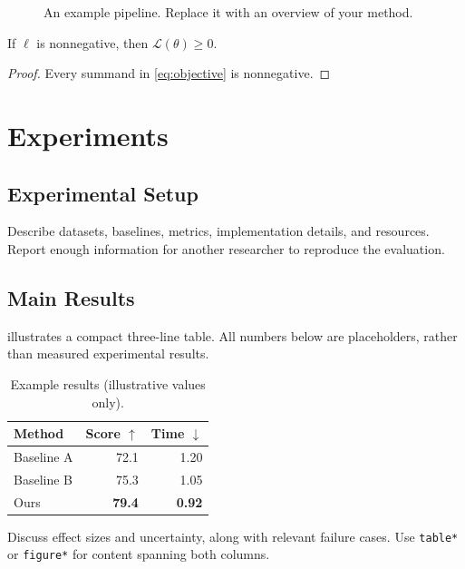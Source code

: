 \documentclass[twocolumn]{paper}
\begin{document}
\begin{figure}[t]
  \centering
  \caption{An example pipeline. Replace it with an overview of your method.}
  \label{fig:pipeline}
\end{figure}

\begin{theorem}
If $\ell$ is nonnegative, then $\mathcal{L}(\theta)\geq 0$.
\end{theorem}
\begin{proof}
Every summand in \cref{eq:objective} is nonnegative.
\end{proof}

\section{Experiments}
\subsection{Experimental Setup}
Describe datasets, baselines, metrics, implementation details, and resources.
Report enough information for another researcher to reproduce the evaluation.

\subsection{Main Results}
 illustrates a compact three-line table. All numbers below
are placeholders, rather than measured experimental results.
\begin{table}[t]
  \centering
  \caption{Example results (illustrative values only).}
  \label{tab:results}
  \begin{tabular}{lrr}
    \toprule
    Method & Score $\uparrow$ & Time $\downarrow$ \\
    \midrule
    Baseline A & 72.1 & 1.20 \\
    Baseline B & 75.3 & 1.05 \\
    Ours & \textbf{79.4} & \textbf{0.92} \\
    \bottomrule
  \end{tabular}
\end{table}
Discuss effect sizes and uncertainty, along with relevant failure cases.
Use \texttt{table*} or \texttt{figure*} for content spanning both columns.
\end{document}
